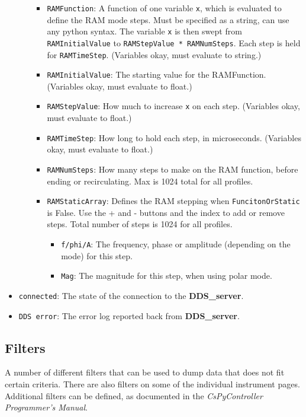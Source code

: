 \documentclass[pdftex,11pt,letterpaper]{article}
\begin{document}
\begin{itemize}
\begin{itemize}
\begin{itemize}
\item \texttt{RAMFunction}:  A function of one variable \texttt{x}, which is evaluated to define the RAM mode steps.  Must be specified as a string, can use any python syntax.  The variable \texttt{x} is then swept from \texttt{RAMInitialValue} to \texttt{RAMStepValue * RAMNumSteps}.  Each step is held for \texttt{RAMTimeStep}.  (Variables okay, must evaluate to string.)
\item \texttt{RAMInitialValue}:  The starting value for the RAMFunction.  (Variables okay, must evaluate to float.)
\item \texttt{RAMStepValue}:  How much to increase \texttt{x} on each step.  (Variables okay, must evaluate to float.)
\item \texttt{RAMTimeStep}:  How long to hold each step, in microseconds.  (Variables okay, must evaluate to float.)
\item \texttt{RAMNumSteps}:  How many steps to make on the RAM function, before ending or recirculating.  Max is 1024 total for all profiles.
\item \texttt{RAMStaticArray}:  Defines the RAM stepping when \texttt{FuncitonOrStatic} is False.  Use the + and - buttons and the index to add or remove steps.  Total number of steps is 1024 for all profiles.
\begin{itemize}
\item \texttt{f/phi/A}:  The frequency, phase or amplitude (depending on the mode) for this step.
\item \texttt{Mag}:  The magnitude for this step, when using polar mode.
\end{itemize}
\end{itemize}
\end{itemize}
\item \texttt{connected}:  The state of the connection to the \textbf{DDS\_server}.
\item \texttt{DDS error}:  The error log reported back from \textbf{DDS\_server}.
\end{itemize}

\subsection{Filters}

A number of different filters that can be used to dump data that does not fit certain criteria.  There are also filters on some of the individual instrument pages.  Additional filters can be defined, as documented in the \textit{CsPyController Programmer's Manual}.
\end{document}
